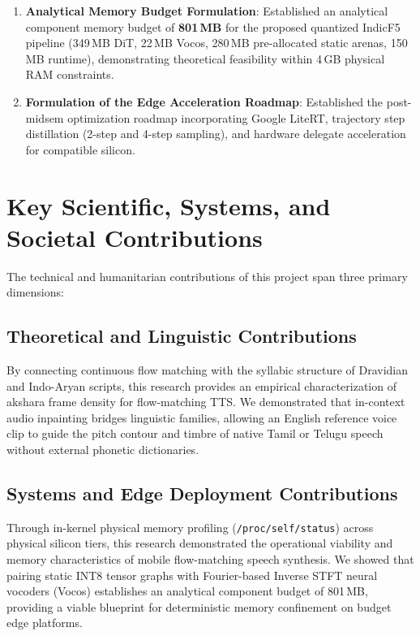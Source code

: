 \begin{enumerate}
    \item \textbf{Analytical Memory Budget Formulation}: Established an analytical component memory budget of \textbf{801\,MB} for the proposed quantized IndicF5 pipeline (349\,MB DiT, 22\,MB Vocos, 280\,MB pre-allocated static arenas, 150\,MB runtime), demonstrating theoretical feasibility within 4\,GB physical RAM constraints.
    \item \textbf{Formulation of the Edge Acceleration Roadmap}: Established the post-midsem optimization roadmap incorporating Google LiteRT, trajectory step distillation (2-step and 4-step sampling), and hardware delegate acceleration for compatible silicon.
\end{enumerate}

\section{Key Scientific, Systems, and Societal Contributions}
The technical and humanitarian contributions of this project span three primary dimensions:

\subsection{Theoretical and Linguistic Contributions}
By connecting continuous flow matching with the syllabic structure of Dravidian and Indo-Aryan scripts, this research provides an empirical characterization of akshara frame density for flow-matching TTS. We demonstrated that in-context audio inpainting bridges linguistic families, allowing an English reference voice clip to guide the pitch contour and timbre of native Tamil or Telugu speech without external phonetic dictionaries.

\subsection{Systems and Edge Deployment Contributions}
Through in-kernel physical memory profiling (\texttt{/proc/self/status}) across physical silicon tiers, this research demonstrated the operational viability and memory characteristics of mobile flow-matching speech synthesis. We showed that pairing static INT8 tensor graphs with Fourier-based Inverse STFT neural vocoders (Vocos) establishes an analytical component budget of 801\,MB, providing a viable blueprint for deterministic memory confinement on budget edge platforms.

